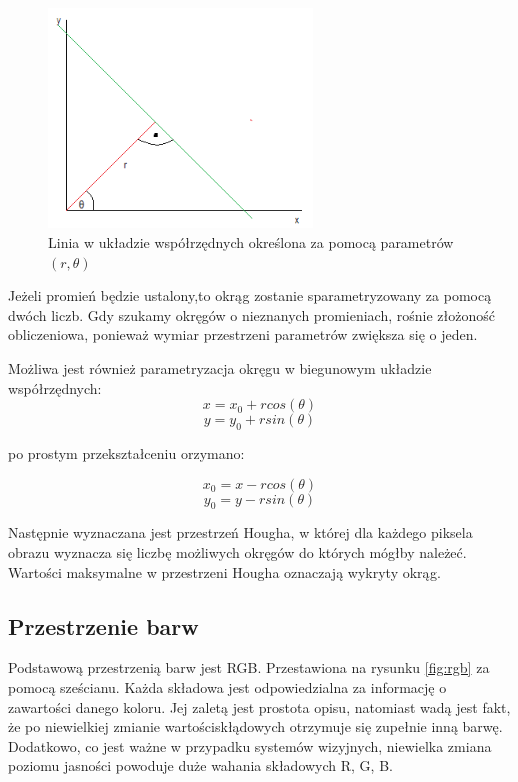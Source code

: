\begin{figure}[h]
\centering
\includegraphics[width=7cm]{img/hough.png}
\caption{Linia w układzie współrzędnych określona za pomocą parametrów $(r, \theta)$}
\label{fig:hough}
\end{figure}

Jeżeli promień będzie ustalony,to okrąg zostanie sparametryzowany za pomocą dwóch liczb. Gdy szukamy okręgów o nieznanych promieniach, rośnie złożoność obliczeniowa, ponieważ wymiar przestrzeni parametrów zwiększa się o jeden.

Możliwa jest również parametryzacja okręgu w biegunowym układzie współrzędnych:
\begin{equation}
x = x_0 + rcos(\theta)
\end{equation}
\begin{equation}
y = y_0 + rsin(\theta)
\end{equation}

po prostym przekształceniu orzymano:

\begin{equation}
x_0 = x - rcos(\theta)
\end{equation}
\begin{equation}
y_0 = y - rsin(\theta)
\end{equation}

Następnie wyznaczana jest przestrzeń Hougha, w której dla każdego piksela obrazu wyznacza się liczbę możliwych okręgów do których mógłby należeć. Wartości maksymalne w przestrzeni Hougha oznaczają wykryty okrąg.

\subsection{Przestrzenie barw}

Podstawową przestrzenią barw jest RGB. Przestawiona na rysunku \ref{fig:rgb} za pomocą sześcianu. Każda składowa jest odpowiedzialna za informację o zawartości danego koloru. Jej zaletą jest prostota opisu, natomiast wadą jest fakt, że po niewielkiej zmianie wartościskłądowych otrzymuje się zupełnie inną barwę. Dodatkowo, co jest ważne w przypadku systemów wizyjnych, niewielka zmiana poziomu jasności powoduje duże wahania składowych R, G, B.

